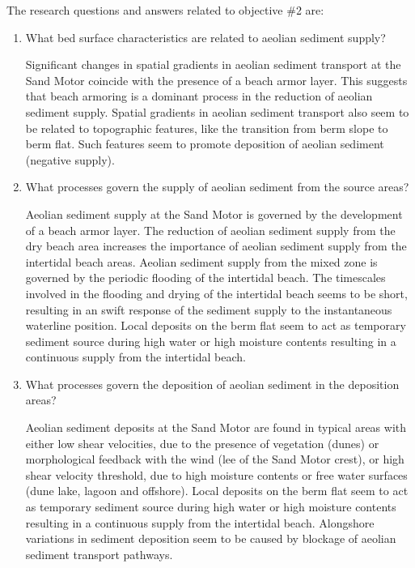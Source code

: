 \begin{description}
  \medskip

  The research questions and answers related to objective \#2 are:

  \begin{enumerate}[{2.}1]
%

  \item What bed surface characteristics are related to aeolian sediment
    supply?

    Significant changes in spatial gradients in aeolian sediment
    transport at the Sand Motor coincide with the presence of a beach
    armor layer. This suggests that beach armoring is a dominant
    process in the reduction of aeolian sediment
    supply. Spatial gradients in aeolian sediment transport
    also seem to be related to topographic features, like the
    transition from berm slope to berm flat. Such features seem to
    promote deposition of aeolian sediment (negative supply).
  
  \item What processes govern the supply of aeolian sediment from the
    source areas?

    Aeolian sediment supply at the Sand Motor is governed by the
    development of a beach armor layer. The reduction of
    aeolian sediment supply from the dry beach area increases the
    importance of aeolian sediment supply from the intertidal beach
    areas. Aeolian sediment supply from the mixed zone is governed by
    the periodic flooding of the intertidal beach. The timescales
    involved in the flooding and drying of the intertidal beach seems
    to be short, resulting in an swift response of the sediment supply
    to the instantaneous waterline position. Local deposits on the
    berm flat seem to act as temporary sediment source during high
    water or high moisture contents resulting in a continuous supply
    from the intertidal beach.

  \item What processes govern the deposition of aeolian sediment in
    the deposition areas?

    Aeolian sediment deposits at the Sand Motor are found in typical
    areas with either low shear velocities, due to the presence of
    vegetation (dunes) or morphological feedback with the wind (lee of
    the Sand Motor crest), or high shear velocity threshold, due to
    high moisture contents or free water surfaces (dune lake, lagoon
    and offshore).  Local deposits on the berm flat seem to act as
    temporary sediment source during high water or high moisture
    contents resulting in a continuous supply from the intertidal
    beach. Alongshore variations in sediment deposition
    seem to be caused by blockage of aeolian sediment transport
    pathways.


\end{enumerate}
\end{description}
